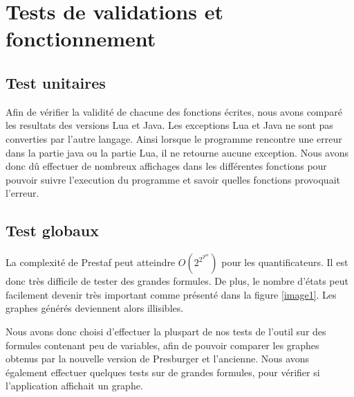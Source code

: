 \section{Tests de validations et fonctionnement}

\subsection{Test unitaires}

Afin de vérifier la validité de chacune des fonctions écrites, nous avons comparé les resultats des versions Lua et Java. Les exceptions Lua et Java ne sont pas converties par l'autre langage. Ainsi lorsque le programme rencontre une erreur dans la partie java ou la partie Lua, il ne retourne aucune exception. Nous avons donc dû effectuer de nombreux affichages dans les différentes fonctions pour pouvoir suivre l'execution du programme et savoir quelles fonctions provoquait l'erreur. 

\subsection{Test globaux}

La complexité de Prestaf peut atteindre $O(2^{2^{2^{pn}}})$ pour les quantificateurs. Il est donc très difficile de tester des grandes formules. De plus, le nombre d'états peut facilement devenir très important comme présenté dans la figure \ref{image1}. Les graphes générés deviennent alors illisibles.\par

Nous avons donc choisi d'effectuer la pluspart de nos tests de l'outil sur des formules contenant peu de variables, afin de pouvoir comparer les graphes obtenus par la nouvelle version de Presburger et l'ancienne. Nous avons également effectuer quelques tests sur de grandes formules, pour vérifier si l'application affichait un graphe.\clearpage

